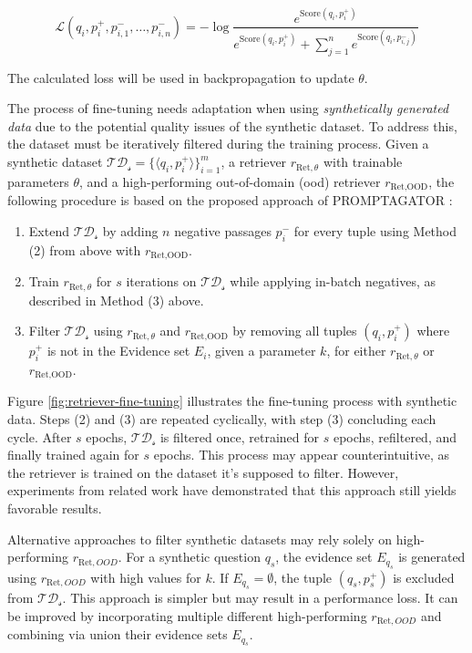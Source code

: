 \begin{equation}
    \mathcal{L}(q_i, p_i^+,p_{i,1}^-, \dots, p_{i,n}^-) = -\log \frac{e^{\text{Score}(q_i,p_i^+)}}{e^{\text{Score}(q_i,p_i^+)} + \sum_{j=1}^{n} e^{\text{Score}(q_i,p_{i,j}^-)}}
\end{equation}

The calculated loss will be used in backpropagation to update $\theta$.

The process of fine-tuning needs adaptation when using \textit{synthetically generated data} due to the potential quality issues of the synthetic dataset. To address this, the dataset must be iteratively filtered during the training process. Given a synthetic dataset $\mathcal{TD_s} = \{\langle q_i, p_i^+\rangle\}_{i=1}^m$, a retriever $r_{\text{Ret}, \theta}$ with trainable parameters $\theta$, and a high-performing out-of-domain (\gls{ood}) retriever $r_{\text{Ret},\text{OOD}}$, the following procedure is based on the proposed approach of PROMPTAGATOR \cite{dai_promptagator_2022}:

\begin{enumerate}
    \item Extend $\mathcal{TD_s}$ by adding $n$ negative passages $p_i^-$ for every tuple using Method (2) from above with $r_{\text{Ret},\text{OOD}}$.
    \item Train $r_{\text{Ret}, \theta}$ for $s$ iterations on $\mathcal{TD_s}$ while applying in-batch negatives, as described in Method (3) above.
    \item Filter $\mathcal{TD_s}$ using $r_{\text{Ret}, \theta}$ and $r_{\text{Ret}, \text{OOD}}$ by removing all tuples $(q_i, p_i^+)$ where $p_i^+$ is not in the Evidence set $E_i$, given a parameter $k$, for either $r_{\text{Ret}, \theta}$ or $r_{\text{Ret}, \text{OOD}}$.
\end{enumerate}

Figure \ref{fig:retriever-fine-tuning} illustrates the fine-tuning process with synthetic data. Steps (2) and (3) are repeated cyclically, with step (3) concluding each cycle. After $s$ epochs, $\mathcal{TD_s}$ is filtered once, retrained for $s$ epochs, refiltered, and finally trained again for $s$ epochs. This process may appear counterintuitive, as the retriever is trained on the dataset it's supposed to filter. However, experiments from related work \cite{dai_promptagator_2022} have demonstrated that this approach still yields favorable results. 

Alternative approaches to filter synthetic datasets may rely solely on high-performing $r_{\text{Ret}, OOD}$. For a synthetic question $q_s$, the evidence set $E_{q_s}$ is generated using $r_{\text{Ret}, OOD}$ with high values for $k$. If $E_{q_s} = \emptyset$, the tuple $(q_s, p_s^+)$ is excluded from $\mathcal{TD_s}$. This approach is simpler but may result in a performance loss. It can be improved by incorporating multiple different high-performing $r_{\text{Ret}, OOD}$ and combining via union their evidence sets $E_{q_s}$.


